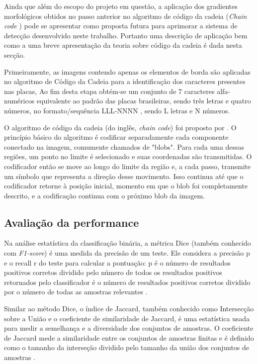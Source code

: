 \documentclass[
	12pt,				%
    oneside,			%
	a4paper,			%
	english,			%
	french,				%
	spanish,			%
	brazil,				%
	]{abntex2}
\begin{document}

Ainda que além do escopo do projeto em questão, a aplicação dos gradientes morfológicos obtidos no passo anterior no algoritmo de código da cadeia (\textit{Chain code} \cite{freeman1961}) pode se apresentar como proposta futura para aprimorar a sistema de detecção desenvolvido neste trabalho. Portanto uma descrição de aplicação bem como a uma breve apresentação da teoria sobre código da cadeia é dada nesta secção.


Primeiramente, as imagens contendo apenas os elementos de borda são aplicadas no algoritmo de Código da Cadeia para a identificação dos caracteres presentes nas placas, Ao fim desta etapa obtém-se um conjunto de 7 caracteres alfa-numéricos equivalente ao padrão das placas brasileiras, sendo três letras e quatro números, no formato/sequência LLL-NNNN , sendo L letras e N números. 

O algoritmo de código da cadeia (do inglês, \textit{chain code}) foi proposto por \cite{freeman1961}. O princípio básico do algoritmo é codificar separadamente cada componente conectado na imagem, comumente chamados de "blobs". Para cada uma dessas regiões, um ponto no limite é selecionado e suas coordenadas são transmitidas. O codificador então se move ao longo do limite da região e, a cada passo, transmite um símbolo que representa a direção desse movimento. Isso continua até que o codificador retorne à posição inicial, momento em que o blob foi completamente descrito, e a codificação continua com o próximo blob da imagem.

\subsection{Avaliação da performance}

Na análise estatística da classificação binária, a métrica Dice (também conhecido com \textit{F1-score}) é uma medida da precisão de um teste. Ele considera a precisão p e o recall r do teste para calcular a pontuação: p é o número de resultados positivos corretos dividido pelo número de todos os resultados positivos retornados pelo classificador é o número de resultados positivos corretos dividido por o número de todas as amostras relevantes \cite{tustison2009}.

Similar ao método Dice, o índice de Jaccard, também conhecido como Intersecção sobre a União e o coeficiente de similaridade de Jaccard, é uma estatística usada para medir a semelhança e a diversidade dos conjuntos de amostras. O coeficiente de Jaccard mede a similaridade entre os conjuntos de amostras finitas e é definido como o tamanho da interseção dividido pelo tamanho da união dos conjuntos de amostras \cite{tustison2009}.
 
\end{document}
